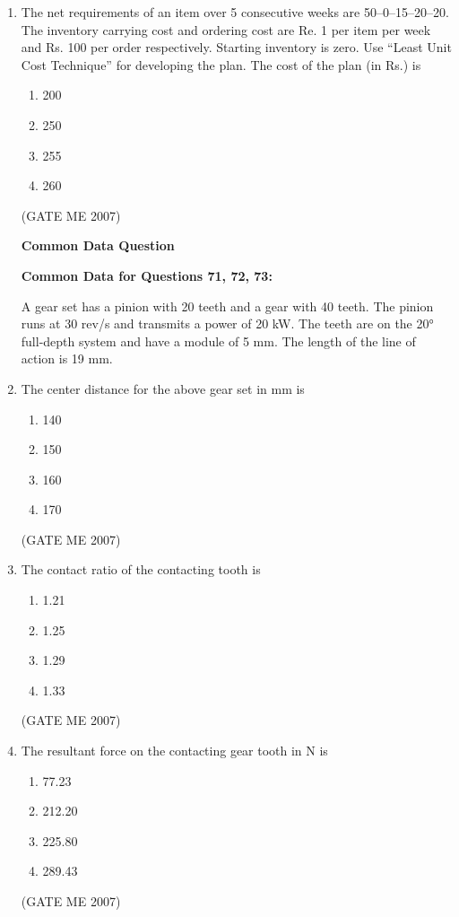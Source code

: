 \documentclass[journal]{IEEEtran}
\begin{document}
\begin{enumerate}
\item The net requirements of an item over 5 consecutive weeks are 50–0–15–20–20. The inventory carrying cost and ordering cost are Re. 1 per item per week and Rs. 100 per order respectively. Starting inventory is zero. Use “Least Unit Cost Technique” for developing the plan. The cost of the plan (in Rs.) is
\begin{multicols}{4}
\begin{enumerate}
\item 200
\item 250
\item 255
\item 260
\end{enumerate}
\end{multicols}
\hfill (GATE ME 2007)

\begin{center}
\textbf{Common Data Question}
\end{center}

\textbf{Common Data for Questions 71, 72, 73:} 

A gear set has a pinion with 20 teeth and a gear with 40 teeth. The pinion runs at 30 rev/s and transmits a power of 20 kW. The teeth are on the 20° full-depth system and have a module of 5 mm. The length of the line of action is 19 mm.

\item The center distance for the above gear set in mm is
\begin{multicols}{4}
\begin{enumerate}
\item 140
\item 150
\item 160
\item 170
\end{enumerate}
\end{multicols}
\hfill (GATE ME 2007)

\item The contact ratio of the contacting tooth is
\begin{multicols}{4}
\begin{enumerate}
\item 1.21
\item 1.25
\item 1.29
\item 1.33
\end{enumerate}
\end{multicols}
\hfill (GATE ME 2007)

\item The resultant force on the contacting gear tooth in N is
\begin{multicols}{4}
\begin{enumerate}
\item 77.23
\item 212.20
\item 225.80
\item 289.43
\end{enumerate}
\end{multicols}
\hfill (GATE ME 2007)


\end{enumerate}
\end{document}
